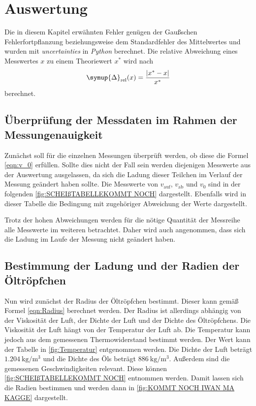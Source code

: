 \section{Auswertung}
\label{sec:Auswertung}
Die in diesem Kapitel erwähnten Fehler genügen der Gaußschen Fehlerfortpflanzung beziehungsweise dem Standardfehler des Mittelwertes und wurden mit \textit{uncertainties}
\cite{uncertainties} in \textit{Python} berechnet. Die relative Abweichung eines Messwertes $x$ zu einem Theoriewert $x^*$ wird nach 
\begin{equation}
  \label{eqn:Delta_rel}
  \symup{\Delta}_\text{rel}(x) = \frac{|x^* - x|}{x^*}
\end{equation}
berechnet.
\subsection{Überprüfung der Messdaten im Rahmen der Messungenauigkeit}
\label{subsec:bedingung}
Zunächst soll für die einzelnen Messungen überprüft werden, ob diese die Formel \eqref{eqn:v_0} erfüllen. Sollte dies nicht der Fall sein werden diejenigen Messwerte aus der 
Auswertung ausgelassen, da sich die Ladung dieser Teilchen im Verlauf der Messung geändert haben sollte. Die Messwerte von $v_{\text{auf}}$, $v_{\text{ab}}$ und $v_0$ 
sind in der folgenden \autoref{fig:SCHEIßTABELLEKOMMT NOCH} dargestellt. Ebenfalls wird in dieser Tabelle die Bedingung mit zugehöriger Abweichung der Werte dargestellt.

%
%
%

Trotz der hohen Abweichungen werden für die nötige Quantität der Messreihe alle Messwerte im weiteren betrachtet. Daher wird auch angenommen, dass sich die Ladung im Laufe der 
Messung nicht geändert haben. 

\subsection{Bestimmung der Ladung und der Radien der Öltröpfchen}
\label{subsec:ladungradius}
Nun wird zunächst der Radius der Öltröpfchen bestimmt. Dieser kann gemäß Formel \eqref{eqn:Radius} berechnet werden. Der Radius ist allerdings abhängig von der Viskosität
der Luft, der Dichte der Luft und der Dichte des Öltröpfchens. Die Viskosität der Luft hängt von der Temperatur der Luft ab. Die Temperatur kann jedoch aus dem gemessenen 
Thermowiderstand bestimmt werden. Der Wert kann der Tabelle in \autoref{fig:Temperatur} entgenommen werden. Die Dichte der Luft beträgt $\qty{1.204}{\kilo\gram\per\cubic\metre}$
und die Dichte des Öls beträgt $\qty{886}{\kilo\gram\per\cubic\metre}$. Außerdem sind die gemessenen Geschwindigkeiten relevant. Diese können \autoref{fig:SCHEIßTABELLEKOMMT NOCH}
entnommen werden. Damit lassen sich die Radien bestimmen und werden dann in \autoref{fig:KOMMT NOCH IWAN MA KAGGE} dargestellt. 

